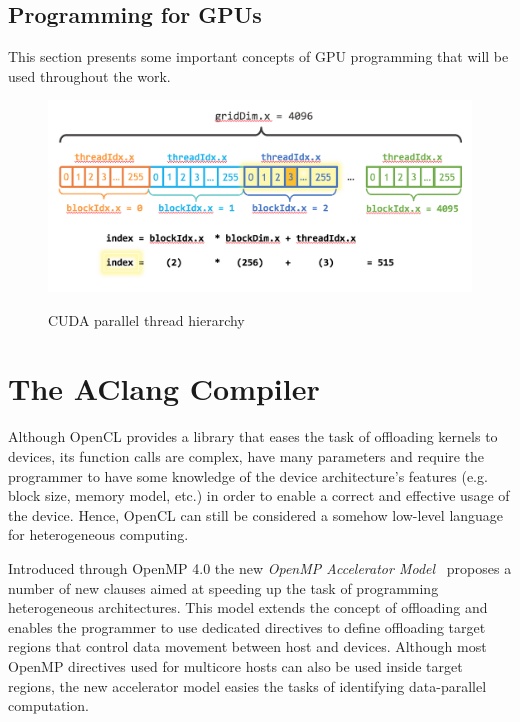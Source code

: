 \documentclass[Ingles]{ic-tese-v1}
\newcommand{\tit}[1]{{\textit{#1}}}
\begin{document}
\subsection{Programming for GPUs}

This section presents some important concepts of GPU programming
that will be used throughout the work.

\begin{figure}[t]
	\caption{CUDA parallel thread hierarchy}
	\centering
	\includegraphics[scale=0.60]{images/cuda_indexing.png}
	\label{fig:cudaindex}
\end{figure}

\section{The AClang Compiler}
\label{sec:AClang}

Although OpenCL provides  a library that eases the  task of offloading
kernels  to  devices,  its  function  calls  are  complex,  have  many
parameters and  require the programmer  to have some knowledge  of the
device architecture's  features (e.g. block size,  memory model, etc.)
in order to enable a correct and effective usage of the device. Hence,
OpenCL  can  still  be  considered a  somehow  low-level  language  for
heterogeneous computing.

Introduced  through   OpenMP  4.0  the  new   \tit{OpenMP  Accelerator
	Model}~\cite{Liao2013}  proposes a  number of  new clauses  aimed at
speeding up the task  of programming heterogeneous architectures. This
model extends the concept of  offloading and enables the programmer to
use  dedicated directives  to  define offloading  target regions  that
control data movement between host  and devices.  Although most OpenMP
directives used  for multicore  hosts can also  be used  inside target
regions, the  new accelerator  model easies  the tasks  of identifying
data-parallel computation.
\end{document}
